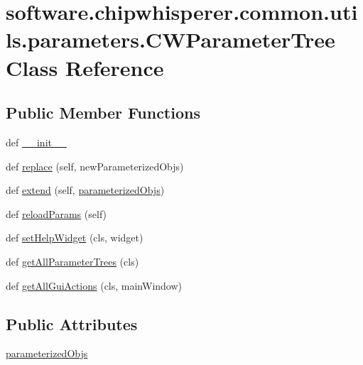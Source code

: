 \hypertarget{classsoftware_1_1chipwhisperer_1_1common_1_1utils_1_1parameters_1_1CWParameterTree}{}\section{software.\+chipwhisperer.\+common.\+utils.\+parameters.\+C\+W\+Parameter\+Tree Class Reference}
\label{classsoftware_1_1chipwhisperer_1_1common_1_1utils_1_1parameters_1_1CWParameterTree}
\subsection*{Public Member Functions}
\begin{DoxyCompactItemize}
\item 
def \hyperlink{classsoftware_1_1chipwhisperer_1_1common_1_1utils_1_1parameters_1_1CWParameterTree_a5188101aa85547899e186296ecb42b41}{\+\_\+\+\_\+init\+\_\+\+\_\+}
\item 
def \hyperlink{classsoftware_1_1chipwhisperer_1_1common_1_1utils_1_1parameters_1_1CWParameterTree_a217d8d3c632d79807c89222ada0f390a}{replace} (self, new\+Parameterized\+Objs)
\item 
def \hyperlink{classsoftware_1_1chipwhisperer_1_1common_1_1utils_1_1parameters_1_1CWParameterTree_a409a4bdd069d430cdd5d1d5de8ebcf76}{extend} (self, \hyperlink{classsoftware_1_1chipwhisperer_1_1common_1_1utils_1_1parameters_1_1CWParameterTree_a0fc5d7c127d686bbe849d8b5098e672b}{parameterized\+Objs})
\item 
def \hyperlink{classsoftware_1_1chipwhisperer_1_1common_1_1utils_1_1parameters_1_1CWParameterTree_a64f77ecad43270f5e153e45218c001f7}{reload\+Params} (self)
\item 
def \hyperlink{classsoftware_1_1chipwhisperer_1_1common_1_1utils_1_1parameters_1_1CWParameterTree_a3c4edb46f29574d9f97f293297967bdc}{set\+Help\+Widget} (cls, widget)
\item 
def \hyperlink{classsoftware_1_1chipwhisperer_1_1common_1_1utils_1_1parameters_1_1CWParameterTree_a510bce2414edab8ef362828b051f4b19}{get\+All\+Parameter\+Trees} (cls)
\item 
def \hyperlink{classsoftware_1_1chipwhisperer_1_1common_1_1utils_1_1parameters_1_1CWParameterTree_a532b73c7a320725052a8ce0f0387cd20}{get\+All\+Gui\+Actions} (cls, main\+Window)
\end{DoxyCompactItemize}
\subsection*{Public Attributes}
\begin{DoxyCompactItemize}
\item 
\hyperlink{classsoftware_1_1chipwhisperer_1_1common_1_1utils_1_1parameters_1_1CWParameterTree_a0fc5d7c127d686bbe849d8b5098e672b}{parameterized\+Objs}
\end{DoxyCompactItemize}
